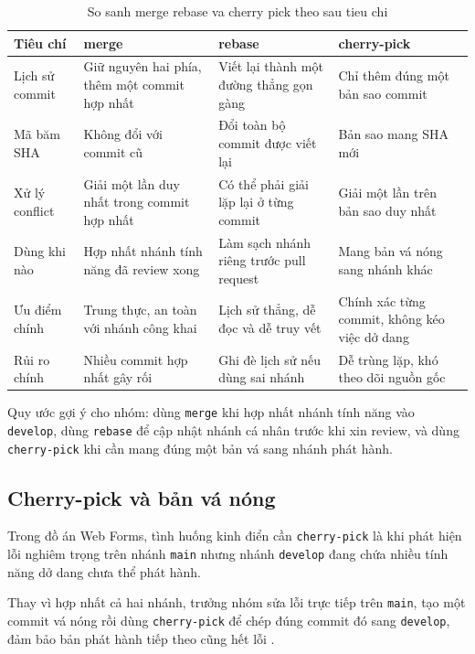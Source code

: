 \begin{table}[H]
\centering
\caption{So sanh merge rebase va cherry pick theo sau tieu chi}
\label{tab:c32-compare}
\begin{tabular}{p{2.6cm} p{3.3cm} p{3.3cm} p{3.3cm}}
\toprule
Tiêu chí & merge & rebase & cherry-pick \\
\midrule
Lịch sử commit & Giữ nguyên hai phía, thêm một commit hợp nhất & Viết lại thành một đường thẳng gọn gàng & Chỉ thêm đúng một bản sao commit \\
Mã băm SHA & Không đổi với commit cũ & Đổi toàn bộ commit được viết lại & Bản sao mang SHA mới \\
Xử lý conflict & Giải một lần duy nhất trong commit hợp nhất & Có thể phải giải lặp lại ở từng commit & Giải một lần trên bản sao duy nhất \\
Dùng khi nào & Hợp nhất nhánh tính năng đã review xong & Làm sạch nhánh riêng trước pull request & Mang bản vá nóng sang nhánh khác \\
Ưu điểm chính & Trung thực, an toàn với nhánh công khai & Lịch sử thẳng, dễ đọc và dễ truy vết & Chính xác từng commit, không kéo việc dở dang \\
Rủi ro chính & Nhiều commit hợp nhất gây rối & Ghi đè lịch sử nếu dùng sai nhánh & Dễ trùng lặp, khó theo dõi nguồn gốc \\
\bottomrule
\end{tabular}
\end{table}

Quy ước gợi ý cho nhóm: dùng \verb|merge| khi hợp nhất nhánh tính năng vào \verb|develop|, dùng \verb|rebase| để cập nhật nhánh cá nhân trước khi xin review, và dùng \verb|cherry-pick| khi cần mang đúng một bản vá sang nhánh phát hành.

\subsection{Cherry-pick và bản vá nóng}
\label{sec:c32-cherry-pick}

Trong đồ án Web Forms, tình huống kinh điển cần \verb|cherry-pick| là khi phát hiện lỗi nghiêm trọng trên nhánh \verb|main| nhưng nhánh \verb|develop| đang chứa nhiều tính năng dở dang chưa thể phát hành.

Thay vì hợp nhất cả hai nhánh, trưởng nhóm sửa lỗi trực tiếp trên \verb|main|, tạo một commit vá nóng rồi dùng \verb|cherry-pick| để chép đúng commit đó sang \verb|develop|, đảm bảo bản phát hành tiếp theo cũng hết lỗi \cite{progit}.

